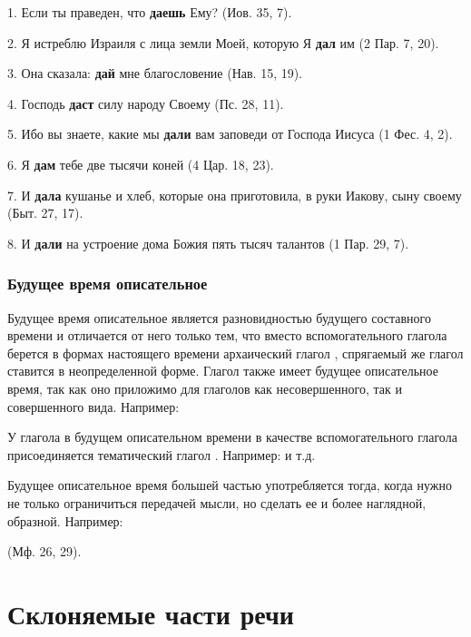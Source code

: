 \documentclass[11pt,a4paper,oneside]{memoir}
\begin{document}
    1. Если ты праведен, что \textbf{даешь} Ему? (Иов. 35, 7).
    
    2. Я истреблю Израиля с лица земли Моей, которую Я \textbf{дал} им (2 Пар. 7, 20).
    
    3. Она сказала: \textbf{дай} мне благословение (Нав. 15, 19).
    
    4. Господь \textbf{даст} силу народу Своему (Пс. 28, 11).
    
    5. Ибо вы знаете, какие мы \textbf{дали} вам заповеди от Господа Иисуса (1 Фес. 4, 2).
    
    6. Я \textbf{дам} тебе две тысячи коней (4 Цар. 18, 23).
    
    7. И \textbf{дала} кушанье и хлеб, которые она приготовила, в руки Иакову, сыну своему (Быт. 27, 17).
    
    8. И \textbf{дали} на устроение дома Божия пять тысяч талантов (1 Пар. 29, 7).

                \subsubsection{Будущее время описательное}

    Будущее время описательное является разновидностью будущего составного времени и отличается от него только тем, что вместо вспомогательного глагола {} берется в формах настоящего времени архаический глагол {}, спрягаемый же глагол ставится в неопределенной форме. Глагол {} также имеет будущее описательное время, так как оно приложимо для глаголов как несовершенного, так и совершенного вида. Например:
    
    \bigskip{}

    У глагола {} в будущем описательном времени в качестве вспомогательного глагола присоединяется тематический глагол {}. Например: {} и т.д.
    
    Будущее описательное время большей частью употребляется тогда, когда нужно не только ограничиться передачей мысли, но сделать ее и более наглядной, образной. Например:
    
    {} (Мф. 26, 29).

        \section{Склоняемые части речи}
\end{document}
